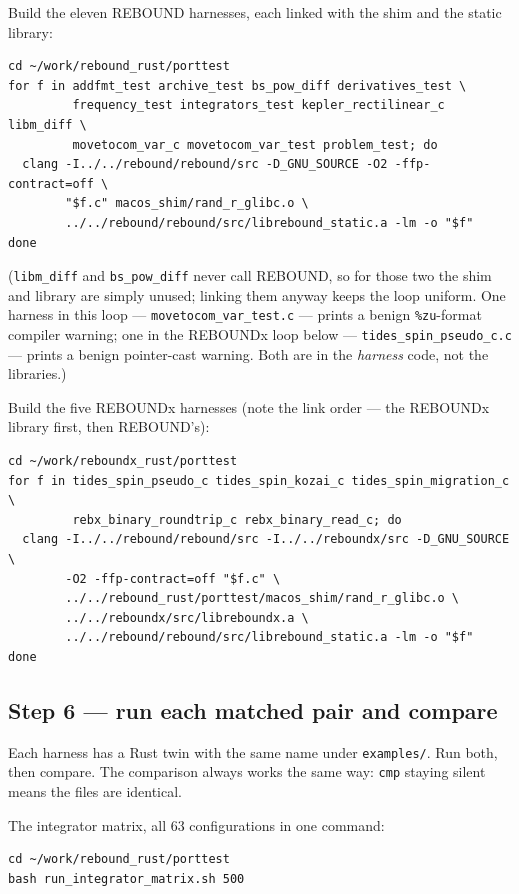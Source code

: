 \documentclass[11pt]{article}
\begin{document}
Build the eleven REBOUND harnesses, each linked with the shim and the static library:

\begin{lstlisting}
cd ~/work/rebound_rust/porttest
for f in addfmt_test archive_test bs_pow_diff derivatives_test \
         frequency_test integrators_test kepler_rectilinear_c libm_diff \
         movetocom_var_c movetocom_var_test problem_test; do
  clang -I../../rebound/rebound/src -D_GNU_SOURCE -O2 -ffp-contract=off \
        "$f.c" macos_shim/rand_r_glibc.o \
        ../../rebound/rebound/src/librebound_static.a -lm -o "$f"
done
\end{lstlisting}

(\texttt{libm\_diff} and \texttt{bs\_pow\_diff} never call REBOUND, so for those two the shim and library are simply unused; linking them anyway keeps the loop uniform. One harness in this loop --- \texttt{movetocom\_var\_test.c} --- prints a benign \texttt{\%zu}-format compiler warning; one in the REBOUNDx loop below --- \texttt{tides\_spin\_pseudo\_c.c} --- prints a benign pointer-cast warning. Both are in the \emph{harness} code, not the libraries.)

Build the five REBOUNDx harnesses (note the link order --- the REBOUNDx library first, then REBOUND's):

\begin{lstlisting}
cd ~/work/reboundx_rust/porttest
for f in tides_spin_pseudo_c tides_spin_kozai_c tides_spin_migration_c \
         rebx_binary_roundtrip_c rebx_binary_read_c; do
  clang -I../../rebound/rebound/src -I../../reboundx/src -D_GNU_SOURCE \
        -O2 -ffp-contract=off "$f.c" \
        ../../rebound_rust/porttest/macos_shim/rand_r_glibc.o \
        ../../reboundx/src/libreboundx.a \
        ../../rebound/rebound/src/librebound_static.a -lm -o "$f"
done
\end{lstlisting}

\subsection{Step 6 --- run each matched pair and compare}

Each harness has a Rust twin with the same name under \texttt{examples/}. Run both, then compare. The comparison always works the same way: \texttt{cmp} staying silent means the files are identical.

The integrator matrix, all 63 configurations in one command:

\begin{lstlisting}
cd ~/work/rebound_rust/porttest
bash run_integrator_matrix.sh 500
\end{lstlisting}
\end{document}
